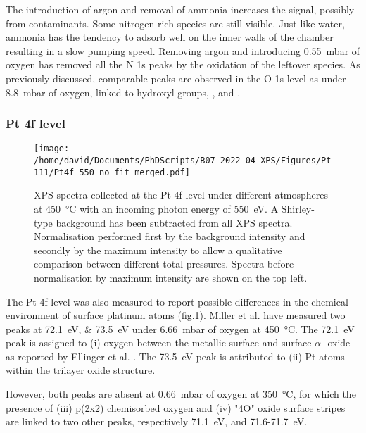 The introduction of argon and removal of ammonia increases the  signal, possibly from contaminants.
Some nitrogen rich species are still visible.
Just like water, ammonia has the tendency to adsorb well on the inner walls of the chamber resulting in a slow pumping speed.
Removing argon and introducing \qty{0.55}{\milli\bar} of oxygen has removed all the N 1s peaks by the oxidation of the leftover  species.
As previously discussed, comparable peaks are observed in the O 1s level as under \qty{8.8}{\milli\bar} of oxygen, linked to hydroxyl groups, , and .

\subsubsection{Pt 4f level}

\begin{figure}[!htb]
    \centering
    \texttt{[image: /home/david/Documents/PhDScripts/B07\_2022\_04\_XPS/Figures/Pt111/Pt4f\_550\_no\_fit\_merged.pdf]}
    \caption{
        XPS spectra collected at the Pt 4f level under different atmospheres at \qty{450}{\degreeCelsius} with an incoming photon energy of \qty{550}{\eV}.
        A Shirley-type background has been subtracted from all XPS spectra.
        Normalisation performed first by the background intensity and secondly by the maximum intensity to allow a qualitative comparison between different total pressures.
        Spectra before normalisation by maximum intensity are shown on the top left.
    }
    \label{fig:Pt4fPt111}
\end{figure}

The Pt 4f level was also measured to report possible differences in the chemical environment of surface platinum atoms (fig.\ref{fig:Pt4fPt111}).
Miller et al. \parencite*{Miller2011} have measured two peaks at \qtylist{72.1;73.5}{\eV} under \qty{6.66}{\milli\bar} of oxygen at \qty{450}{\degreeCelsius}.
The \qty{72.1}{\eV} peak is assigned to (i) oxygen between the metallic surface and surface $\alpha$- oxide as reported by Ellinger et al. \parencite*{Ellinger2008}.
The \qty{73.5}{\eV} peak is attributed to (ii) Pt atoms within the trilayer oxide structure.

However, both peaks are absent at \qty{0.66}{\milli\bar} of oxygen at \qty{350}{\degreeCelsius}, for which the presence of (iii) p(2x2) chemisorbed oxygen and (iv) "4O" oxide surface stripes are linked to two other peaks, respectively \qty{71.1}{\eV}, and \num{71.6}-\qty{71.7}{\eV}.

